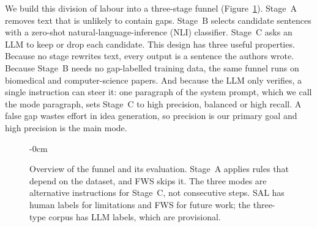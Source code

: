 We build this division of labour into a three-stage funnel (Figure~\ref{fig:pipeline-overview}). Stage~A removes text that is unlikely to contain gaps. Stage~B selects candidate sentences with a zero-shot natural-language-inference (NLI) classifier. Stage~C asks an LLM to keep or drop each candidate. This design has three useful properties. Because no stage rewrites text, every output is a sentence the authors wrote. Because Stage~B needs no gap-labelled training data, the same funnel runs on biomedical and computer-science papers. And because the LLM only verifies, a single instruction can steer it: one paragraph of the system prompt, which we call the mode paragraph, sets Stage~C to high precision, balanced or high recall. A false gap wastes effort in idea generation, so precision is our primary goal and high precision is the main mode.

\begin{figure}[!htb]
\begin{adjustwidth}{-\extralength}{0cm}
\centering

\end{adjustwidth}
\caption{Overview of the funnel and its evaluation. Stage~A applies rules that depend on the dataset, and FWS skips it. The three modes are alternative instructions for Stage~C, not consecutive steps. SAL has human labels for limitations and FWS for future work; the three-type corpus has LLM labels, which are provisional.\label{fig:pipeline-overview}}
\end{figure}

